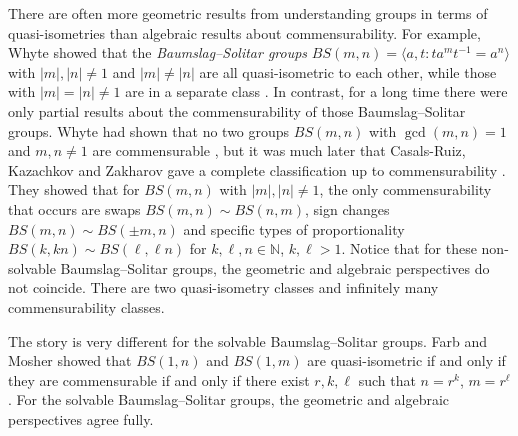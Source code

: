 \documentclass[10pt]{article}
\def\naturals{{\mathbb N}}
\theoremstyle{definition}
\begin{document}
There are often more geometric results from understanding groups in terms of quasi-isometries than algebraic results about commensurability. For example, Whyte showed that the \textit{Baumslag--Solitar groups}  $BS(m,n) = \langle a, t: ta^m t^{-1} = a^n \rangle$ with  $|m|,|n|\ne 1$ and $|m|\ne |n|$ are all quasi-isometric to each other, while those with $|m|=|n|\ne 1$ are in a separate class \cite{Whyte}. In contrast, for a long time there were only partial results about the commensurability of those Baumslag--Solitar groups. Whyte had shown that no two groups $BS(m, n)$ with $\gcd(m,n)=1$ and $m,n\ne 1$ are commensurable \cite{Whyte}, but it was  much later that Casals-Ruiz, Kazachkov and Zakharov gave a complete classification up to commensurability \cite{CRKZ}. They showed that for $BS(m,n)$ with $|m|,|n|\ne 1$, the only commensurability that occurs are swaps $BS(m,n)\sim BS(n,m)$, sign changes $BS(m,n) \sim BS(\pm m,n)$ and specific types of proportionality $BS(k,kn) \sim BS(\ell,\ell n)$ for $k,\ell,n\in \naturals$, $k,\ell >1$. Notice that for these non-solvable Baumslag--Solitar groups, the geometric and algebraic perspectives do not coincide. There are two quasi-isometry classes and infinitely many commensurability classes. 

The story is very different for the solvable Baumslag--Solitar groups. Farb and Mosher showed  that  $BS(1,n)$ and $BS(1,m)$ are quasi-isometric if and only if they are commensurable if and only if there exist $r, k , \ell$ such that $n = r^k$, $m=r^\ell$ \cite{FarbMosher}. For the  solvable Baumslag--Solitar groups, the geometric and algebraic perspectives  agree fully. 
\end{document}
